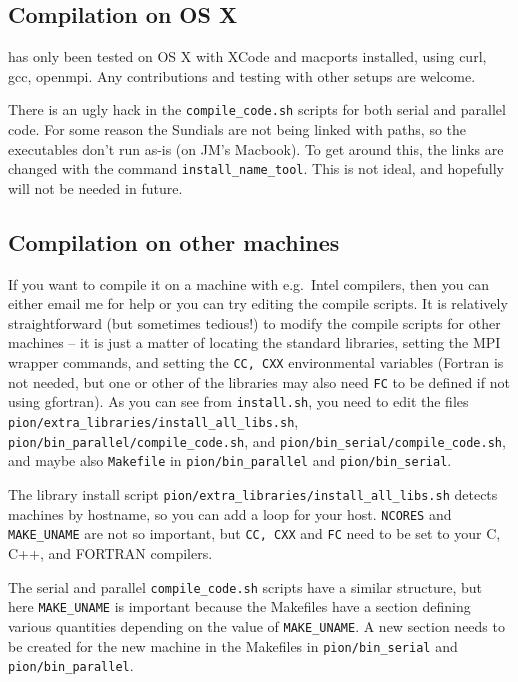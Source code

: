 \documentclass[a4paper,11pt]{report}
\begin{document}
\subsection{Compilation on OS X}
\pion{} has only been tested on OS X with XCode and macports installed, using curl, gcc, openmpi.
Any contributions and testing with other setups are welcome.

There is an ugly hack in the \verb|compile_code.sh| scripts for both serial and parallel code.
For some reason the Sundials are not being linked with paths, so the executables don't run as-is (on JM's Macbook).
To get around this, the links are changed with the command \verb|install_name_tool|.
This is not ideal, and hopefully will not be needed in future.

\subsection{Compilation on other machines}
If you want to compile it on a machine with e.g.\ Intel compilers, then you can either email me for help or you can try editing the compile scripts.
It is relatively straightforward (but sometimes tedious!) to modify the compile scripts for other machines -- it is just a matter of locating the standard libraries, setting the MPI wrapper commands, and setting the \texttt{CC, CXX} environmental variables (Fortran is not needed, but one or other of the libraries may also need \texttt{FC} to be defined if not using gfortran).
As you can see from \verb|install.sh|, you need to edit the files
\verb|pion/extra_libraries/install_all_libs.sh|,
\verb|pion/bin_parallel/compile_code.sh|, and
\verb|pion/bin_serial/compile_code.sh|, and maybe also \verb|Makefile| in
\verb|pion/bin_parallel| and \verb|pion/bin_serial|.

The library install script \verb|pion/extra_libraries/install_all_libs.sh| detects machines by hostname, so you can add a loop for your host.
\texttt{NCORES} and \texttt{MAKE\_UNAME} are not so important, but \texttt{CC, CXX} and \texttt{FC} need to be set to your C, C++, and FORTRAN compilers.

The serial and parallel \verb|compile_code.sh| scripts have a similar structure, but here \texttt{MAKE\_UNAME} is important because the Makefiles have a section defining various quantities depending on the value of \texttt{MAKE\_UNAME}.
A new section needs to be created for the new machine in the Makefiles in \verb|pion/bin_serial| and \verb|pion/bin_parallel|.
\end{document}
